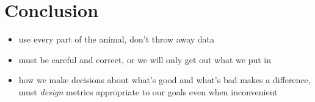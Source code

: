 \chapter*{Conclusion}




\begin{itemize}
	\item use every part of the animal, don't throw away data
	\item must be careful and correct, or we will only get out what we put in
	\item how we make decisions about what's good and what's bad makes a difference, must \textit{design} metrics appropriate to our goals even when inconvenient
\end{itemize}









